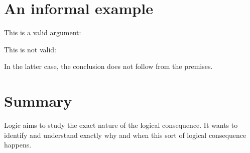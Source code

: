 \documentclass[../../../main.tex]{subfiles}
\begin{document}
\section{An informal example}

This is a valid argument:

\begin{prooftree*}
\end{prooftree*}

\noindent
This is not valid:

\begin{prooftree*}
\end{prooftree*}

\noindent
In the latter case, the conclusion does not follow from the premises.


\section{Summary}

Logic aims to study the exact nature of the logical consequence. It wants to identify and understand exactly why and when this sort of logical consequence happens. 
\end{document}
